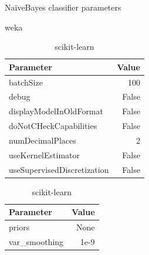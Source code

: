 \begin{table}[H]
    \footnotesize
    \centering
    \caption{NaïveBayes classifier parameters} \label{tab:nb_param}
    \begin{subtable}[t]{0.5\linewidth}
        \caption{weka \cite{noauthor_naivebayes_nodate}}
        \centering
        \begin{tabular}{lr}\toprule
            Parameter & Value \\\midrule
            batchSize & 100 \\
            debug & False \\
            displayModelInOldFormat & False \\
            doNotCHeckCapabilities & False \\
            numDecimalPlaces & 2 \\
            useKernelEstimator & False \\
            useSupervisedDiscretization & False\\\bottomrule
        \end{tabular}
    \end{subtable}%
    \begin{subtable}[t]{.5\linewidth}
        \caption{scikit-learn \cite{noauthor_sklearnnaive_bayesgaussiannb_nodate}}
        \centering
        \begin{tabular}{lr}\toprule
            Parameter & Value \\\midrule
            priors & None \\
            var\_smoothing & 1e-9 \\\bottomrule
        \end{tabular}
    \end{subtable}%
\end{table}


